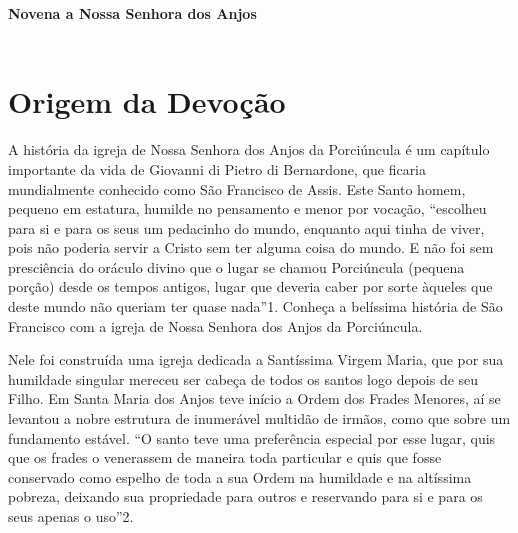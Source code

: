 \documentclass[a4paper,12pt]{extarticle} \usepackage[utf8]{inputenc}
\begin{document}
\begin{center}
  \textbf{\LARGE Novena a Nossa Senhora dos Anjos}\\[0.5em]
  \\
\end{center}

\tableofcontents
\thispagestyle{empty}

\newpage

\section{Origem da Devoção}

A história da igreja de Nossa Senhora dos Anjos da Porciúncula é um capítulo importante da vida de Giovanni di Pietro di Bernardone, que ficaria mundialmente conhecido como São Francisco de Assis. Este Santo homem, pequeno em estatura, humilde no pensamento e menor por vocação, “escolheu para si e para os seus um pedacinho do mundo, enquanto aqui tinha de viver, pois não poderia servir a Cristo sem ter alguma coisa do mundo. E não foi sem presciência do oráculo divino que o lugar se chamou Porciúncula (pequena porção) desde os tempos antigos, lugar que deveria caber por sorte àqueles que deste mundo não queriam ter quase nada”1.
Conheça a belíssima história de São Francisco com a igreja de Nossa Senhora dos Anjos da Porciúncula.

Nele foi construída uma igreja dedicada a Santíssima Virgem Maria, que por sua humildade singular mereceu ser cabeça de todos os santos logo depois de seu Filho. Em Santa Maria dos Anjos teve início a Ordem dos Frades Menores, aí se levantou a nobre estrutura de inumerável multidão de irmãos, como que sobre um fundamento estável. “O santo teve uma preferência especial por esse lugar, quis que os frades o venerassem de maneira toda particular e quis que fosse conservado como espelho de toda a sua Ordem na humildade e na altíssima pobreza, deixando sua propriedade para outros e reservando para si e para os seus apenas o uso”2.
\end{document}
